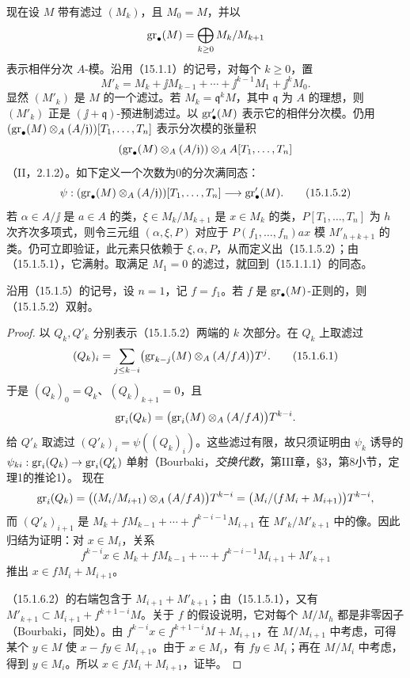 现在设 $M$ 带有滤过 $(M_k)$，且 $M_0=M$，并以
\[
 \operatorname{gr}_\bullet(M)=\bigoplus_{k\geq0}M_k/M_{k+1}
\]
表示相伴分次 $A$-模。沿用（15.1.1）的记号，对每个 $k\geq0$，置
\begin{equation}
 M'_k=M_k+\jj M_{k-1}+\cdots+\jj^{k-1}M_1+\jj^kM_0.
 \tag{15.1.5.1}
\end{equation}
显然 $(M'_k)$ 是 $M$ 的一个滤过。若 $M_k=\mathfrak q^kM$，其中 $\mathfrak q$ 为 $A$ 的理想，则 $(M'_k)$ 正是 $(\jj+\mathfrak q)$-预进制滤过。以 $\operatorname{gr}'_\bullet(M)$ 表示它的相伴分次模。仍用
$(\operatorname{gr}_\bullet(M)\otimes_A(A/\mathfrak j))[T_1,\ldots,T_n]$ 表示分次模的张量积
\[
 (\operatorname{gr}_\bullet(M)\otimes_A(A/\mathfrak j))\otimes_A A[T_1,\ldots,T_n]
\]
（II，2.1.2）。如下定义一个次数为0的分次满同态：
\begin{equation}
 \psi:(\operatorname{gr}_\bullet(M)\otimes_A(A/\mathfrak j))[T_1,\ldots,T_n]
 \longrightarrow\operatorname{gr}'_\bullet(M).
 \tag{15.1.5.2}
\end{equation}
若 $\alpha\in A/\jj$ 是 $a\in A$ 的类，$\xi\in M_k/M_{k+1}$ 是 $x\in M_k$ 的类，$P[T_1,\ldots,T_n]$ 为 $h$ 次齐次多项式，则令三元组 $(\alpha,\xi,P)$ 对应于 $P(f_1,\ldots,f_n)ax$ 模 $M'_{h+k+1}$ 的类。仍可立即验证，此元素只依赖于 $\xi,\alpha,P$，从而定义出（15.1.5.2）；由（15.1.5.1），它满射。取满足 $M_1=0$ 的滤过，就回到（15.1.1.1）的同态。

沿用（15.1.5）的记号，设 $n=1$，记 $f=f_1$。若 $f$ 是 $\operatorname{gr}_\bullet(M)$-正则的，则（15.1.5.2）双射。
\begin{proof}
以 $Q_k,Q'_k$ 分别表示（15.1.5.2）两端的 $k$ 次部分。在 $Q_k$ 上取滤过
\begin{equation}
 (Q_k)_i=\sum_{j\leq k-i}
 \bigl(\operatorname{gr}_{k-j}(M)\otimes_A(A/fA)\bigr)T^j.
 \tag{15.1.6.1}
\end{equation}
于是 $(Q_k)_0=Q_k$、$(Q_k)_{k+1}=0$，且
\[
 \operatorname{gr}_i(Q_k)=\bigl(\operatorname{gr}_i(M)\otimes_A(A/fA)\bigr)T^{k-i}.
\]
给 $Q'_k$ 取滤过 $(Q'_k)_i=\psi((Q_k)_i)$。这些滤过有限，故只须证明由 $\psi_k$ 诱导的
$\psi_{ki}:\operatorname{gr}_i(Q_k)\to\operatorname{gr}_i(Q'_k)$ 单射（Bourbaki，\textit{交换代数}，第III章，§3，第8小节，定理1的推论1）。
现在
\[
 \operatorname{gr}_i(Q_k)
 =\bigl((M_i/M_{i+1})\otimes_A(A/fA)\bigr)T^{k-i}
 =\bigl(M_i/(fM_i+M_{i+1})\bigr)T^{k-i},
\]
而 $(Q'_k)_{i+1}$ 是
$M_k+fM_{k-1}+\cdots+f^{k-i-1}M_{i+1}$ 在 $M'_k/M'_{k+1}$ 中的像。因此归结为证明：对 $x\in M_i$，关系
\begin{equation}
 f^{k-i}x\in M_k+fM_{k-1}+\cdots+f^{k-i-1}M_{i+1}+M'_{k+1}
 \tag{15.1.6.2}
\end{equation}
推出 $x\in fM_i+M_{i+1}$。

（15.1.6.2）的右端包含于 $M_{i+1}+M'_{k+1}$；由（15.1.5.1），又有
$M'_{k+1}\subset M_{i+1}+f^{k+1-i}M$。关于 $f$ 的假设说明，它对每个 $M/M_h$ 都是非零因子（Bourbaki，同处）。由
$f^{k-i}x\in f^{k+1-i}M+M_{i+1}$，在 $M/M_{i+1}$ 中考虑，可得某个 $y\in M$ 使
$x-fy\in M_{i+1}$。由于 $x\in M_i$，有 $fy\in M_i$；再在 $M/M_i$ 中考虑，得到 $y\in M_i$。所以 $x\in fM_i+M_{i+1}$，证毕。
\end{proof}

